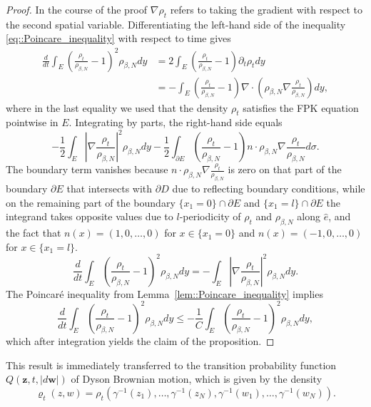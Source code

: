 \documentclass[11pt]{article}
\numberwithin{equation}{section}
\theoremstyle{definition}
\begin{document}
\begin{proof}
In the course of the proof $\nabla \rho_{t}$ refers to taking the gradient with respect to the second spatial variable. Differentiating the left-hand side of the inequality \eqref{eq::Poincare_inequality} with respect to time gives
\begin{align*}
    \frac{d}{dt}\int_{E}\left(\frac{\rho_{t}}{\rho_{\beta,N}}-1\right)^2 \rho_{\beta,N}dy
    &=2 \int_{E}\left(\frac{\rho_{t}}{\rho_{\beta,N}}-1\right) \partial_{t}\rho_{t} dy\\
    &=-\int_{E}\left(\frac{\rho_{t}}{\rho_{\beta,N}}-1\right)\nabla\cdot\left(\rho_{\beta,N}\nabla\frac{\rho_{t}}{\rho_{\beta,N}}\right)dy,
\end{align*}
where in the last equality we used that the density $\rho_{t}$ satisfies the FPK equation pointwise in $E$. Integrating by parts, the right-hand side equals
\[
    -\frac{1}{2}\int_{E}\left|\nabla\frac{\rho_{t}}{\rho_{\beta,N}}\right|^{2}\rho_{\beta,N}dy  
    - \frac{1}{2}\int_{\partial E}\left(\frac{\rho_{t}}{\rho_{\beta,N}}-1\right) n\cdot \rho_{\beta,N}\nabla\frac{\rho_{t}}{\rho_{\beta,N}}d\sigma.
\]
The boundary term vanishes because $n\cdot \rho_{\beta,N}\nabla\frac{\rho_{t}}{\rho_{\beta,N}}$ is zero on that part of the boundary $\partial E$ that intersects with $\partial D$ due to reflecting boundary conditions, while on the remaining part of the boundary $\{x_{1}=0\}\cap\partial E$  and $\{x_{1}=l\}\cap \partial E$ the integrand takes opposite values due to $l$-periodicity of $\rho_{t}$ and $\rho_{\beta,N}$ along $\hat{e}$, and the fact that $n(x)=(1,0,\dots, 0)$ for $x\in \{x_{1}=0\}$ and $n(x)=(-1,0,\dots, 0)$ for $x\in \{x_{1}=l\}$.
\[
   \frac{d}{dt}\int_{E}\left(\frac{\rho_{t}}{\rho_{\beta,N}}-1\right)^2 \rho_{\beta,N}dy 
   =-\int_{E}\left|\nabla\frac{\rho_{t}}{\rho_{\beta,N}}\right|^{2}\rho_{\beta,N}dy. 
\]
The Poincaré inequality from Lemma~\ref{lem::Poincare_inequality} implies 
\[
    \frac{d}{dt}\int_{E}\left(\frac{\rho_{t}}{\rho_{\beta,N}}-1\right)^2 \rho_{\beta,N}dy
    \le - \frac{1}{C}\int_{E}\left(\frac{\rho_{t}}{\rho_{\beta,N}}-1\right)^2 \rho_{\beta,N}dy,
\]
which after integration yields the claim of the proposition.
\end{proof}
\noindent This result is immediately transferred to the transition probability function $Q(\boldsymbol{z}, t, |d\boldsymbol{w}|)$  of Dyson Brownian motion, which is given by the density 
\[
    \varrho_{t}(z,w) = \rho_{t}\left(\gamma^{-1}(z_{1}), \dots, \gamma^{-1}(z_{N}) , \gamma^{-1}(w_{1}), \dots, \gamma^{-1}(w_{N})\right).
\]
\end{document}
